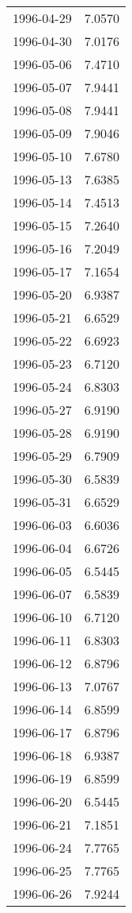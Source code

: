 \begin{tabular}{lr}
1996-04-29 &      7.0570 \\
1996-04-30 &      7.0176 \\
1996-05-06 &      7.4710 \\
1996-05-07 &      7.9441 \\
1996-05-08 &      7.9441 \\
1996-05-09 &      7.9046 \\
1996-05-10 &      7.6780 \\
1996-05-13 &      7.6385 \\
1996-05-14 &      7.4513 \\
1996-05-15 &      7.2640 \\
1996-05-16 &      7.2049 \\
1996-05-17 &      7.1654 \\
1996-05-20 &      6.9387 \\
1996-05-21 &      6.6529 \\
1996-05-22 &      6.6923 \\
1996-05-23 &      6.7120 \\
1996-05-24 &      6.8303 \\
1996-05-27 &      6.9190 \\
1996-05-28 &      6.9190 \\
1996-05-29 &      6.7909 \\
1996-05-30 &      6.5839 \\
1996-05-31 &      6.6529 \\
1996-06-03 &      6.6036 \\
1996-06-04 &      6.6726 \\
1996-06-05 &      6.5445 \\
1996-06-07 &      6.5839 \\
1996-06-10 &      6.7120 \\
1996-06-11 &      6.8303 \\
1996-06-12 &      6.8796 \\
1996-06-13 &      7.0767 \\
1996-06-14 &      6.8599 \\
1996-06-17 &      6.8796 \\
1996-06-18 &      6.9387 \\
1996-06-19 &      6.8599 \\
1996-06-20 &      6.5445 \\
1996-06-21 &      7.1851 \\
1996-06-24 &      7.7765 \\
1996-06-25 &      7.7765 \\
1996-06-26 &      7.9244 \\

\end{tabular}
